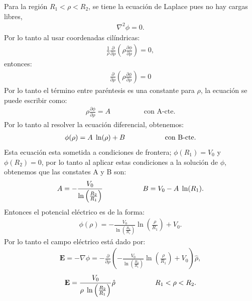 \documentclass[11pt,fleqn]{book} %
\begin{document}
\begin{example}
Para la regi\'on $R_{1}< \rho < R_{2}$, se tiene la ecuaci\'on de Laplace pues no hay cargas libres,
\begin{eqnarray*}
\nabla^{2}\phi=0.
\end{eqnarray*}
Por lo tanto al usar coordenadas cil\'indricas:
\begin{eqnarray*}
\frac{1}{\rho}\frac{\partial}{\partial \rho}\left(\rho \frac{\partial\phi}{\partial \rho} \right)=0,
\end{eqnarray*}
entonces:
\begin{eqnarray*}
\frac{\partial}{\partial \rho}\left(\rho \frac{\partial\phi}{\partial \rho} \right)=0
\end{eqnarray*}
Por lo tanto el t\'ermino entre par\'entesis es una constante para $\rho$, la ecuaci\'on se puede escribir como:
\begin{eqnarray*}
\rho \frac{\partial \phi}{\partial \rho}=A \hspace{2cm} \text{con A-cte.}
\end{eqnarray*}
Por lo tanto al resolver la ecuaci\'on diferencial, obtenemos:
\begin{eqnarray}
\phi(\rho)=A\hspace{1mm}\ln(\rho)+B \hspace{2cm} \label{potenciale} \text{con B-cte.}
\end{eqnarray}
Esta ecuaci\'on esta sometida a condiciones de frontera; $\phi(R_{1})=V_{0}$ y $\phi(R_{2})=0$, por lo tanto al aplicar estas condiciones a la soluci\'on de $\phi$, obtenemos que las constates A y B son:
\begin{eqnarray*}
A=-\frac{V_{0}}{\ln\left( \frac{R_{2}}{R_{1}} \right)} \hspace{2cm} B=V_{0}-A\hspace{1mm}\ln(R_{1}).
\end{eqnarray*}
Entonces el potencial el\'ectrico es de la forma:
\begin{eqnarray*}
\phi(\rho)=-\frac{V_{0}}{\ln\left( \frac{R_{2}}{R_{1}} \right)}\ln\left( \frac{\rho}{R_{1}} \right)+V_{0}.
\end{eqnarray*}
Por lo tanto el campo el\'ectrico est\'a dado por:
\begin{eqnarray*}
\textbf{E}=-\nabla\phi=-\frac{\partial}{\partial \rho}\left(-\frac{V_{0}}{\ln\left( \frac{R_{2}}{R_{1}} \right)}\ln\left( \frac{\rho}{R_{1}} \right)+V_{0}\right)\hat{\rho},
\end{eqnarray*}
\begin{equation}
\textbf{E}=\frac{V_{0}}{\rho \hspace{1mm}\ln\left( \frac{R_{2}}{R_{1}} \right)}\hat{\rho} \hspace{2cm}R_{1}< \rho < R_{2}.  \label{E2}

\end{equation}
\end{example}
\end{document}
